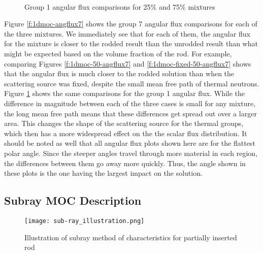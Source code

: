\begin{figure}[H]
    \centering
    \hfill
    ~
    \caption{Group 1 angular flux comparisons for 25\% and 75\% mixtures}\label{f:1dmoc-angflux1}
\end{figure}


Figure \ref{f:1dmoc-angflux7} shows the group 7 angular flux comparisons for each of the three mixtures.  We immediately see that for each of them, the angular flux for the mixture is closer to the rodded result than the unrodded result than what might be expected based on the volume fraction of the rod.  For example, comparing Figures \ref{f:1dmoc-50-angflux7} and \ref{f:1dmoc-fixed-50-angflux7} shows that the angular flux is much closer to the rodded solution than when the scattering source was fixed, despite the small mean free path of thermal neutrons.  Figure \ref{f:1dmoc-angflux1} shows the same comparisons for the group 1 angular flux.  While the difference in magnitude between each of the three cases is small for any mixture, the long mean free path means that these differences get spread out over a larger area.  This changes the shape of the scattering source for the thermal groups, which then has a more widespread effect on the the scalar flux distribution.  It should be noted as well that all angular flux plots shown here are for the flattest polar angle.  Since the steeper angles travel through more material in each region, the differences between them go away more quickly.  Thus, the angle shown in these plots is the one having the largest impact on the solution.

\subsection{Subray MOC Description}

\begin{figure}
    \centering
    \texttt{[image: sub-ray\_illustration.png]}
    \caption{Illustration of subray method of characteristics for partially inserted rod}\label{f:subrayMOC}
\end{figure}